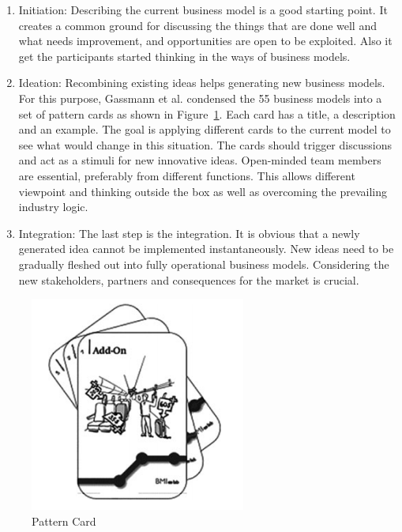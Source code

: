 		\begin{enumerate}					
			\item Initiation: Describing the current business model is a good starting point. It creates a common ground for discussing the things that are done well and what needs improvement, and opportunities are open to be exploited. Also it get the participants started thinking in the ways of business models.

			\item Ideation: Recombining existing ideas helps generating new business models. For this purpose, Gassmann et al. condensed the 55 business models into a set of pattern cards as shown in Figure~\ref{fig:pattern_card}. Each card has a title, a description and an example. The goal is applying different cards to the current model to see what would change in this situation. The cards should trigger discussions and act as a stimuli for new innovative ideas. Open-minded team members are essential, preferably from different functions. This allows different viewpoint and thinking outside the box as well as overcoming the prevailing industry logic.
			
			\item Integration: The last step is the integration. It is obvious that a newly generated idea cannot be implemented instantaneously. New ideas need to be gradually fleshed out into fully operational business models. Considering the new stakeholders, partners and consequences for the market is crucial.
		\end{enumerate}

		\begin{figure}[ht]
		    \begin{center}
			    \includegraphics[scale=0.6]{Talk11/Figure2.png}
		    \end{center}
		    \caption{Pattern Card \cite[p.~95]{gassmann55}}
		    \label{fig:pattern_card}
		\end{figure}	
